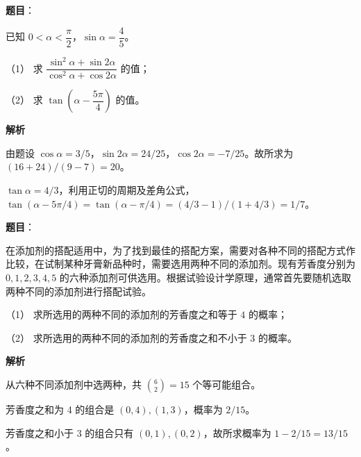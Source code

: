 \begin{answer}

\textbf{题目}：

已知 $0<\alpha<\dfrac\pi2$，$\sin\alpha=\dfrac45$。

（1） 求 $\dfrac{\sin^2\alpha+\sin2\alpha}{\cos^2\alpha+\cos2\alpha}$ 的值；

（2） 求 $\tan\left(\alpha-\dfrac{5\pi}{4}\right)$ 的值。

\textbf{解析}


由题设 $\cos\alpha=3/5$，$\sin2\alpha=24/25$，$\cos2\alpha=-7/25$。故所求为 $(16+24)/(9-7)=20$。


$\tan\alpha=4/3$，利用正切的周期及差角公式，$\tan(\alpha-5\pi/4)=\tan(\alpha-\pi/4)=(4/3-1)/(1+4/3)=1/7$。



\end{answer}
\begin{answer}

\textbf{题目}：

在添加剂的搭配适用中，为了找到最佳的搭配方案，需要对各种不同的搭配方式作比较，在试制某种牙膏新品种时，需要选用两种不同的添加剂。现有芳香度分别为 $0,1,2,3,4,5$ 的六种添加剂可供选用。根据试验设计学原理，通常首先要随机选取两种不同的添加剂进行搭配试验。

（1） 求所选用的两种不同的添加剂的芳香度之和等于 $4$ 的概率；

（2） 求所选用的两种不同的添加剂的芳香度之和不小于 $3$ 的概率。

\textbf{解析}

从六种不同添加剂中选两种，共 $\binom62=15$ 个等可能组合。


芳香度之和为 4 的组合是 $(0,4),(1,3)$，概率为 $2/15$。


芳香度之和小于 3 的组合只有 $(0,1),(0,2)$，故所求概率为 $1-2/15=13/15$。



\end{answer}

